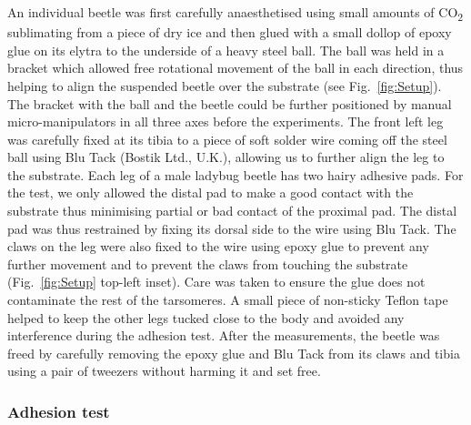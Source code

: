 \documentclass[vruler,JEB]{COB}%
\begin{document}
An individual beetle was first carefully anaesthetised using small amounts of CO\textsubscript{2} sublimating
from a piece of dry ice and then glued with a small dollop of epoxy glue on its elytra to the underside of a heavy steel ball. The ball was held in a bracket which allowed free rotational movement of the ball in each direction, thus helping to align the suspended beetle over the substrate (see Fig.~\ref{fig:Setup}). The bracket with the ball and the beetle could be further positioned by manual micro-manipulators in all three axes before the experiments. The front left leg was carefully fixed at its tibia to a piece of soft solder wire coming off the steel ball using Blu Tack (Bostik Ltd., U.K.), allowing us to further align the leg to the substrate. Each leg of a male ladybug beetle has two hairy adhesive pads. For the test, we only allowed the distal pad to make a good contact with the substrate thus minimising partial or bad contact of the proximal pad. The distal pad was thus restrained by fixing its dorsal side to the wire using Blu Tack. The claws on the leg were also fixed to the wire using epoxy glue to prevent any further movement and to prevent the claws from touching the substrate (Fig.~\ref{fig:Setup} top-left inset). Care was taken to ensure the glue does not contaminate the rest of the tarsomeres. A small piece of non-sticky Teflon tape helped to keep the other legs tucked close to the body and avoided any interference during the adhesion test. After the measurements, the beetle was freed by carefully removing the epoxy glue and Blu Tack from its claws and tibia using a pair of tweezers without harming it and set free. 


\subsubsection{Adhesion test}
\end{document}
